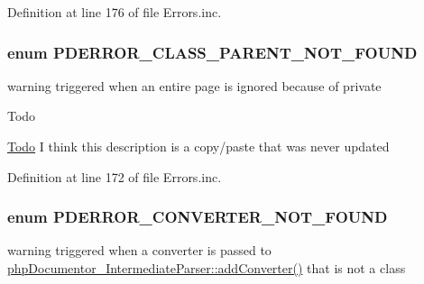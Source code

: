 \-Definition at line 176 of file \-Errors.\-inc.

\hypertarget{_errors_8inc_a25436b54459fc28d3cdf61a0d60bfb4c}{
\subsubsection[{\-P\-D\-E\-R\-R\-O\-R\-\_\-\-C\-L\-A\-S\-S\-\_\-\-P\-A\-R\-E\-N\-T\-\_\-\-N\-O\-T\-\_\-\-F\-O\-U\-N\-D}]{\setlength{\rightskip}{0pt plus 5cm}enum {\bf \-P\-D\-E\-R\-R\-O\-R\-\_\-\-C\-L\-A\-S\-S\-\_\-\-P\-A\-R\-E\-N\-T\-\_\-\-N\-O\-T\-\_\-\-F\-O\-U\-N\-D}}}\label{_errors_8inc_a25436b54459fc28d3cdf61a0d60bfb4c}
warning triggered when an entire page is ignored because of  private \begin{DoxyRefDesc}{\-Todo}
\item[\hyperlink{todo__todo000082}{\-Todo}]\-I think this description is a copy/paste that was never updated \end{DoxyRefDesc}


\-Definition at line 172 of file \-Errors.\-inc.

\hypertarget{_errors_8inc_ae4c8dbc9922acf0f3868b75d2a2599fe}{
\subsubsection[{\-P\-D\-E\-R\-R\-O\-R\-\_\-\-C\-O\-N\-V\-E\-R\-T\-E\-R\-\_\-\-N\-O\-T\-\_\-\-F\-O\-U\-N\-D}]{\setlength{\rightskip}{0pt plus 5cm}enum {\bf \-P\-D\-E\-R\-R\-O\-R\-\_\-\-C\-O\-N\-V\-E\-R\-T\-E\-R\-\_\-\-N\-O\-T\-\_\-\-F\-O\-U\-N\-D}}}\label{_errors_8inc_ae4c8dbc9922acf0f3868b75d2a2599fe}
warning triggered when a converter is passed to \hyperlink{classphp_documentor___intermediate_parser_af3c436d15adbf6d92dfdc75633775be7}{php\-Documentor\-\_\-\-Intermediate\-Parser\-::add\-Converter()} that is not a class 

